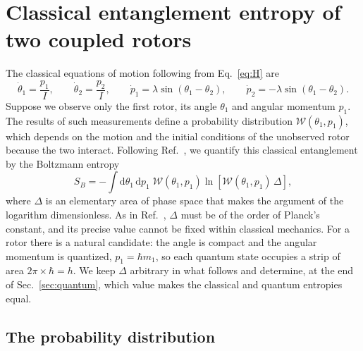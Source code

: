 \documentclass[aps,preprint,12pt,superscriptaddress,nofootinbib]{revtex4-2}
\newcommand{\dd}{\mathrm{d}}
\newcommand{\Wc}{\mathcal{W}}
\begin{document}
\section{Classical entanglement entropy of two coupled rotors}
\label{sec:classical}

The classical equations of motion following from Eq.~\eqref{eq:H} are
\begin{equation}
\dot\theta_{1}=\frac{p_{1}}{I},\qquad
\dot\theta_{2}=\frac{p_{2}}{I},\qquad
\dot p_{1}=\lambda\sin(\theta_{1}-\theta_{2}),\qquad
\dot p_{2}=-\lambda\sin(\theta_{1}-\theta_{2}).
\label{eq:eom}
\end{equation}
Suppose we observe only the first rotor, its angle $\theta_{1}$ and angular momentum
$p_{1}$. The results of such measurements define a probability distribution
$\Wc(\theta_{1},p_{1})$, which depends on the motion and the initial conditions of
the unobserved rotor because the two interact. Following Ref.~\cite{DKS}, we
quantify this classical entanglement by the Boltzmann entropy
\begin{equation}
S_{B}=-\int\dd\theta_{1}\,\dd p_{1}\;\Wc(\theta_{1},p_{1})
\ln\left[\Wc(\theta_{1},p_{1})\,\Delta\right],
\label{eq:SB}
\end{equation}
where $\Delta$ is an elementary area of phase space that makes the argument of the
logarithm dimensionless. As in Ref.~\cite{DKS}, $\Delta$ must be of the order of
Planck's constant, and its precise value cannot be fixed within classical mechanics.
For a rotor there is a natural candidate: the angle is compact and the angular
momentum is quantized, $p_{1}=\hbar m_{1}$, so each quantum state occupies a strip of
area $2\pi\times\hbar=h$. We keep $\Delta$ arbitrary in what follows and determine,
at the end of Sec.~\ref{sec:quantum}, which value makes the classical and quantum
entropies equal.

\subsection{The probability distribution}
\label{sec:prob}
\end{document}
